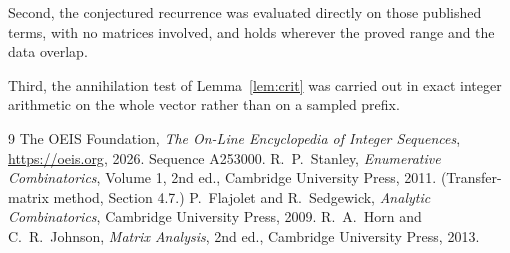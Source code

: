 \documentclass[11pt,a4paper]{article}
\theoremstyle{plain}
\theoremstyle{definition}
\begin{document}
Second, the conjectured recurrence was evaluated directly on those published terms, with no
matrices involved, and holds wherever the proved range and the data overlap.

Third, the annihilation test of Lemma~\ref{lem:crit} was carried out in exact integer
arithmetic on the whole vector rather than on a sampled prefix.

\begin{thebibliography}{9}
 The OEIS Foundation, \emph{The On-Line Encyclopedia of Integer
Sequences}, \url{https://oeis.org}, 2026. Sequence A253000.
 R.~P.~Stanley, \emph{Enumerative Combinatorics}, Volume 1, 2nd ed.,
Cambridge University Press, 2011. (Transfer-matrix method, Section 4.7.)
 P.~Flajolet and R.~Sedgewick, \emph{Analytic Combinatorics}, Cambridge
University Press, 2009.
 R.~A.~Horn and C.~R.~Johnson, \emph{Matrix Analysis}, 2nd ed., Cambridge
University Press, 2013.
\end{thebibliography}
\end{document}
